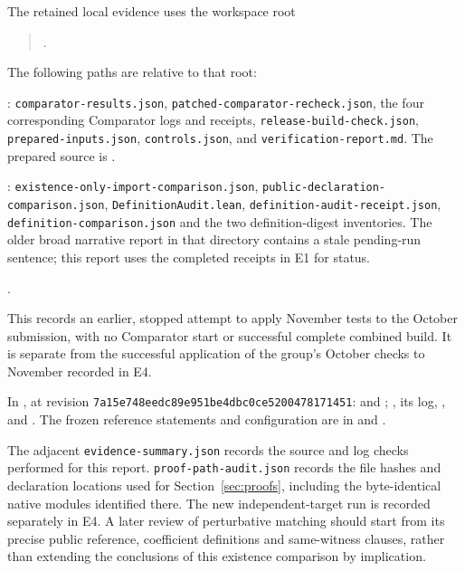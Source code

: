 \documentclass[11pt]{article}
\newcommand{\code}[1]{{\small\nolinkurl{#1}}}
\begin{document}
The retained local evidence uses the workspace root
\begin{quote}\small{}.\end{quote}
The following paths are relative to that root:
\begin{description}[style=nextline,leftmargin=3.5em,labelwidth=3em,align=left]
\item[E1] : \code{comparator-results.json}, \code{patched-comparator-recheck.json}, the four corresponding Comparator logs and receipts, \code{release-build-check.json}, \code{prepared-inputs.json}, \code{controls.json}, and \code{verification-report.md}. The prepared source is .
\item[E2] : \code{existence-only-import-comparison.json}, \code{public-declaration-comparison.json}, \code{DefinitionAudit.lean}, \code{definition-audit-receipt.json}, \code{definition-comparison.json} and the two definition-digest inventories. The older broad narrative report in that directory contains a stale pending-run sentence; this report uses the completed receipts in E1 for status.
\item[E3] .
\par This records an earlier, stopped attempt to apply November tests to the October submission, with no Comparator start or successful complete combined build. It is separate from the successful application of the group's October checks to November recorded in E4.
\item[E4] In , at revision \code{7a15e748eedc89e951be4dbc0ce5200478171451}:  and ; , its log, , and . The frozen reference statements and configuration are in  and .
\end{description}

The adjacent \code{evidence-summary.json} records the source and log checks
performed for this report. \code{proof-path-audit.json} records the file
hashes and declaration locations used for Section~\ref{sec:proofs}, including
the byte-identical native modules identified there.
The new independent-target run is recorded separately in E4. A later review of perturbative
matching should start from its precise public reference, coefficient
definitions and same-witness clauses, rather than extending the conclusions
of this existence comparison by implication.
\end{document}
